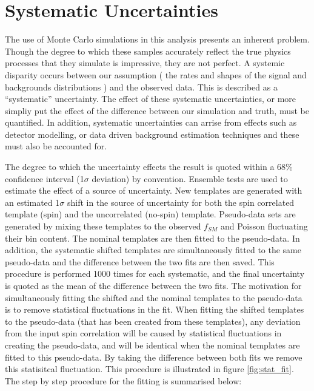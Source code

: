 
\section{Systematic Uncertainties}
\label{sec:systematics}

The use of Monte Carlo simulations in this analysis presents an inherent problem. Though the degree to which these samples accurately reflect the true physics processes that they simulate is impressive, they are not perfect. A systemic disparity occurs between our assumption ( the rates and shapes of the signal and backgrounds distributions ) and the observed data. This is described as a ``systematic'' uncertainty. The effect of these systematic uncertainties, or more simpliy put the effect of the difference between our simulation and truth, must be quantified. In addition, systematic uncertainties can arrise from effects such as detector modelling, or data driven background estimation techniques and these must also be accounted for. 

The degree to which the uncertainty effects the result is quoted within a 68\% confidence interval (1$\sigma$ deviation) by convention. Ensemble tests are used to estimate the effect of a source of uncertainty. New templates are generated with an estimated 1$\sigma$ shift in the source of uncertainty for both the spin correlated template (spin) and the uncorrelated (no-spin) template.  
Pseudo-data sets are generated by mixing these templates to the observed $f_{SM}$ and Poisson fluctuating their bin content.
The nominal templates are then fitted to the pseudo-data. In addition, the systematic shifted templates are simultaneously fitted to the same pseudo-data and the difference between the two fits are then saved. This procedure is performed 1000 times for each systematic, and the final uncertainty is quoted as the mean of the difference between the two fits.
	The motivation for simultaneously fitting the shifted and the nominal templates to the pseudo-data is to remove statistical fluctuations in the fit. When fitting the shifted templates to the pseudo-data (that has been created from these templates), any deviation from the input spin correlation will be caused by statistical fluctuations in creating the pseudo-data, and will be identical when the nominal templates are fitted to this pseudo-data. By taking the difference between both fits we remove this statisitcal fluctuation. This procedure is illustrated in figure \ref{fig:stat_fit}. The step by step procedure for the fitting is summarised below:
 
